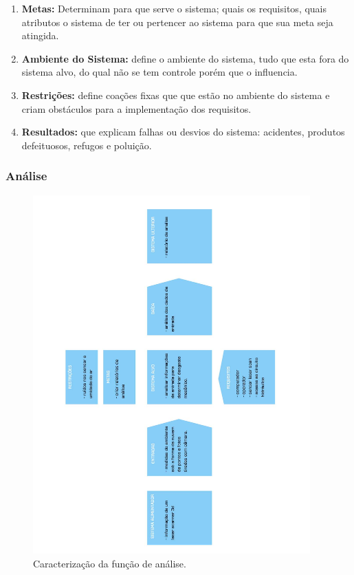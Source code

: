 \documentclass[12pt,a4paper]{article}
\begin{document}
\begin{enumerate}
	\item \textbf {Metas:} Determinam para que serve o sistema; quais os
	requisitos, quais atributos o sistema de ter ou pertencer ao sistema para que sua meta seja atingida.
	\item \textbf {Ambiente do Sistema:} define o ambiente do sistema, tudo que
	esta fora do sistema alvo, do qual não se tem controle porém que o influencia.
	\item \textbf {Restrições:} define coações fixas que que estão no ambiente do
	sistema e criam obstáculos para a implementação dos requisitos.
	\item \textbf {Resultados:} que explicam falhas ou desvios do sistema:
	acidentes, produtos defeituosos, refugos e poluição.
\end{enumerate}

\subsubsection {Análise}

\begin{figure}[H]
\begin{center}
  \includegraphics[width=0.95\textwidth]{figs/caracterizacao_analise.jpg}
  \caption{Caracterização da função de análise.}
  \label{fig:caracterização análise}
\end{center}
\end{figure} 
\end{document}
